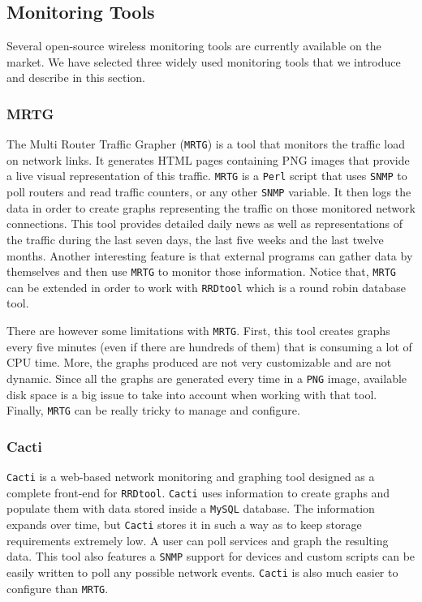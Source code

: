 \subsection{Monitoring Tools}
Several open-source wireless monitoring tools are currently available on the market. We have selected three widely used monitoring tools that we introduce and describe in this section.

\subsubsection{MRTG}
The Multi Router Traffic Grapher (\texttt{MRTG}) \cite{mrtg} is a tool that monitors the traffic load on network links. It generates HTML pages containing PNG images that provide a live visual representation of this traffic. \texttt{MRTG} is a \texttt{Perl} script that uses \texttt{SNMP} to poll routers and read traffic counters, or any other \texttt{SNMP} variable. It then logs the data in order to create graphs representing the traffic on those monitored network connections. This tool provides detailed daily news as well as representations of the traffic during the last seven days, the last five weeks and the last twelve months. Another interesting feature is that external programs can gather data by themselves and then use \texttt{MRTG} to monitor those information. Notice that, \texttt{MRTG} can be extended in order to work with \texttt{RRDtool} \cite{rrdtool} which is a round robin database tool.

There are however some limitations with \texttt{MRTG}. First, this tool creates graphs every five minutes (even if there are hundreds of them) that is consuming a lot of CPU time. More, the graphs produced are not very customizable and are not dynamic. Since all the graphs are generated every time in a \texttt{PNG} image, available disk space is a big issue to take into account when working with that tool. Finally, \texttt{MRTG} can be really tricky to manage and configure.

\subsubsection{Cacti}
\texttt{Cacti} \cite{cacti} is a web-based network monitoring and graphing tool designed as a complete front-end for \texttt{RRDtool}. \texttt{Cacti} uses information to create graphs and populate them with data stored inside a \texttt{MySQL} database. The information expands over time, but \texttt{Cacti} stores it in such a way as to keep storage requirements extremely low. A user can poll services and graph the resulting data. This tool also features a \texttt{SNMP} support for devices and custom scripts can be easily written to poll any possible network events. \texttt{Cacti} is also much easier to configure than \texttt{MRTG}.

